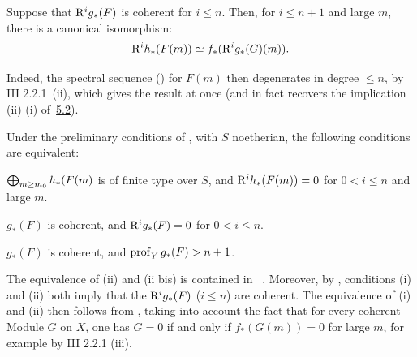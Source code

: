 \begin{corollaire} \label{XII.5.4}
Suppose that $\mathrm R^ig_\ast(F)$ is coherent for $i\leq n$. Then, for $i\leq n+1$ and large $m$, there is a canonical isomorphism:
\[
\mathrm R^ih_\ast(F(m)) \simeq f_\ast(\mathrm R^ig_\ast(G)(m)).
\]
\end{corollaire}

Indeed, the spectral sequence () for $F(m)$ then degenerates in degree $\leq n$, by \EGA III 2.2.1~(ii), which gives the result at once (and in fact recovers the implication (ii) \ALORS (i) of~\hyperref[XII.5.2]{5.2}).

\enlargethispage{1.2\baselineskip}%
\begin{corollaire} \label{XII.5.5}
Under the preliminary conditions of , with $S$ noetherian, the following conditions are equivalent:
\begin{enumeratei}
\item
$\bigoplus_{m\geq m_0}h_\ast(F(m)$ is of finite type over $S$, and $\mathrm R^ih_\ast(F(m))=0$ for $0<i\leq n$ and large $m$.
\item
$g_\ast(F)$ is coherent, and $\mathrm R^ig_\ast(F)=0$ for $0<i\leq n$.
\item[\textup{(ii bis)}] $g_\ast(F)$ is coherent, and $\operatorname{prof}_Y g_\ast(F)>n+1$.
\end{enumeratei}
\end{corollaire}

The equivalence of (ii) and (ii bis) is contained in ~. Moreover, by , conditions (i) and (ii) both imply that the $\mathrm R^ig_\ast(F)$ ($i\leq n$) are coherent. The equivalence of (i) and (ii) then follows from , taking into account the fact that for every coherent Module $G$ on $X$, one has $G=0$ if and only if $f_\ast(G(m))=0$ for large $m$, for example by \EGA III 2.2.1 (iii).

